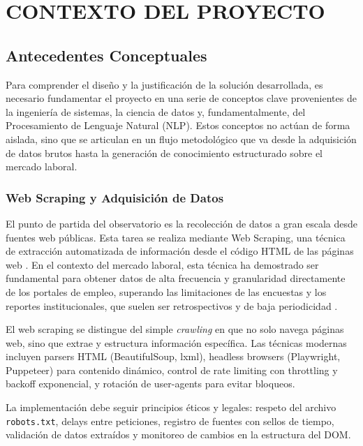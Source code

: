 \chapter{CONTEXTO DEL PROYECTO}

\section{Antecedentes Conceptuales}

Para comprender el diseño y la justificación de la solución desarrollada, es necesario fundamentar el proyecto en una serie de conceptos clave provenientes de la ingeniería de sistemas, la ciencia de datos y, fundamentalmente, del Procesamiento de Lenguaje Natural (NLP). Estos conceptos no actúan de forma aislada, sino que se articulan en un flujo metodológico que va desde la adquisición de datos brutos hasta la generación de conocimiento estructurado sobre el mercado laboral.

\subsection{Web Scraping y Adquisición de Datos}

El punto de partida del observatorio es la recolección de datos a gran escala desde fuentes web públicas. Esta tarea se realiza mediante Web Scraping, una técnica de extracción automatizada de información desde el código HTML de las páginas web \cite{orozco2019webscraping}. En el contexto del mercado laboral, esta técnica ha demostrado ser fundamental para obtener datos de alta frecuencia y granularidad directamente de los portales de empleo, superando las limitaciones de las encuestas y los reportes institucionales, que suelen ser retrospectivos y de baja periodicidad \cite{cardenas2015, rubio2025}.

El web scraping se distingue del simple \textit{crawling} en que no solo navega páginas web, sino que extrae y estructura información específica. Las técnicas modernas incluyen parsers HTML (BeautifulSoup, lxml), headless browsers (Playwright, Puppeteer) para contenido dinámico, control de rate limiting con throttling y backoff exponencial, y rotación de user-agents para evitar bloqueos.

La implementación debe seguir principios éticos y legales: respeto del archivo \texttt{robots.txt}, delays entre peticiones, registro de fuentes con sellos de tiempo, validación de datos extraídos y monitoreo de cambios en la estructura del DOM.

